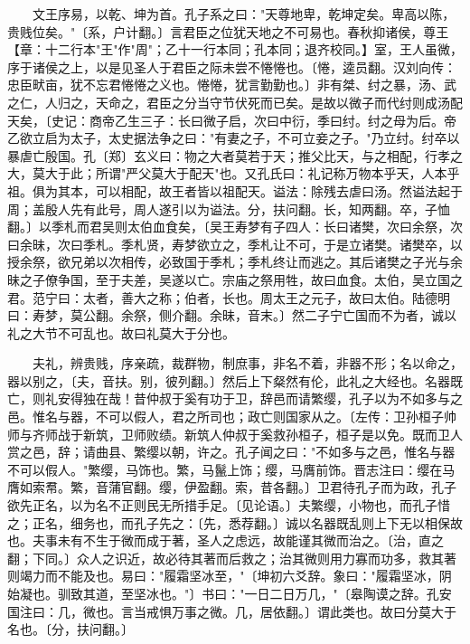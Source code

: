 　　文王序易，以乾、坤为首。孔子系之曰："天尊地卑，乾坤定矣。卑高以陈，贵贱位矣。"〔系，户计翻。〕言君臣之位犹天地之不可易也。春秋抑诸侯，尊王【章：十二行本"王"作"周"；乙十一行本同；孔本同；退齐校同。】室，王人虽微，序于诸侯之上，以是见圣人于君臣之际未尝不惓惓也。〔惓，逵员翻。汉刘向传：忠臣畎亩，犹不忘君惓惓之义也。惓惓，犹言勤勤也。〕非有桀、纣之暴，汤、武之仁，人归之，天命之，君臣之分当守节伏死而已矣。是故以微子而代纣则成汤配天矣，〔史记：商帝乙生三子：长曰微子启，次曰中衍，季曰纣。纣之母为后。帝乙欲立启为太子，太史据法争之曰："有妻之子，不可立妾之子。"乃立纣。纣卒以暴虐亡殷国。孔〔郑〕玄义曰：物之大者莫若于天；推父比天，与之相配，行孝之大，莫大于此；所谓"严父莫大于配天"也。又孔氏曰：礼记称万物本乎天，人本乎祖。俱为其本，可以相配，故王者皆以祖配天。谥法：除残去虐曰汤。然谥法起于周；盖殷人先有此号，周人遂引以为谥法。分，扶问翻。长，知两翻。卒，子恤翻。〕以季札而君吴则太伯血食矣，〔吴王寿梦有子四人：长曰诸樊，次曰余祭，次曰余昧，次曰季札。季札贤，寿梦欲立之，季札让不可，于是立诸樊。诸樊卒，以授余祭，欲兄弟以次相传，必致国于季札；季札终让而逃之。其后诸樊之子光与余昧之子僚争国，至于夫差，吴遂以亡。宗庙之祭用牲，故曰血食。太伯，吴立国之君。范宁曰：太者，善大之称；伯者，长也。周太王之元子，故曰太伯。陆德明曰：寿梦，莫公翻。余祭，侧介翻。余昧，音末。〕然二子宁亡国而不为者，诚以礼之大节不可乱也。故曰礼莫大于分也。

　　夫礼，辨贵贱，序亲疏，裁群物，制庶事，非名不着，非器不形；名以命之，器以别之，〔夫，音扶。别，彼列翻。〕然后上下粲然有伦，此礼之大经也。名器既亡，则礼安得独在哉！昔仲叔于奚有功于卫，辞邑而请繁缨，孔子以为不如多与之邑。惟名与器，不可以假人，君之所司也；政亡则国家从之。〔左传：卫孙桓子帅师与齐师战于新筑，卫师败绩。新筑人仲叔于奚救孙桓子，桓子是以免。既而卫人赏之邑，辞；请曲县、繁缨以朝，许之。孔子闻之曰："不如多与之邑，惟名与器不可以假人。"繁缨，马饰也。繁，马鬣上饰；缨，马膺前饰。晋志注曰：缨在马膺如索帬。繁，音蒲官翻。缨，伊盈翻。索，昔各翻。〕卫君待孔子而为政，孔子欲先正名，以为名不正则民无所措手足。〔见论语。〕夫繁缨，小物也，而孔子惜之；正名，细务也，而孔子先之：〔先，悉荐翻。〕诚以名器既乱则上下无以相保故也。夫事未有不生于微而成于著，圣人之虑远，故能谨其微而治之。〔治，直之翻；下同。〕众人之识近，故必待其著而后救之；治其微则用力寡而功多，救其著则竭力而不能及也。易曰："履霜坚冰至，"〔坤初六爻辞。象曰："履霜坚冰，阴始凝也。驯致其道，至坚冰也。"〕书曰："一日二日万几，"〔皋陶谟之辞。孔安国注曰：几，微也。言当戒惧万事之微。几，居依翻。〕谓此类也。故曰分莫大于名也。〔分，扶问翻。〕

